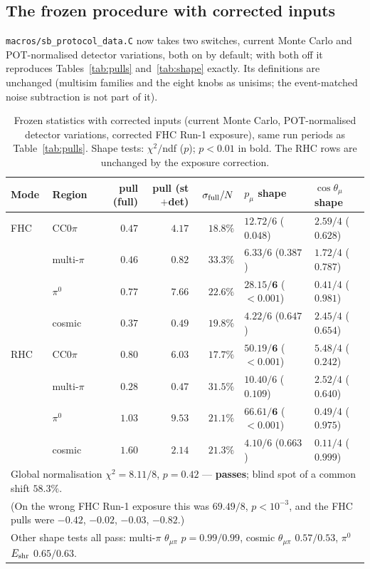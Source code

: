 \documentclass[11pt,a4paper]{article}
\begin{document}
\subsection{The frozen procedure with corrected inputs}
\label{sec:protocol_corrected}

\texttt{macros/sb\_protocol\_data.C} now takes two switches, current Monte Carlo and POT-normalised detector
variations, both on by default; with both off it reproduces Tables~\ref{tab:pulls} and~\ref{tab:shape} exactly.
Its definitions are unchanged (multisim families and the eight knobs as unisims; the event-matched noise
subtraction is not part of it).

\begin{table}[H]
  \centering
  \caption{Frozen statistics with corrected inputs (current Monte Carlo, POT-normalised detector variations,
    corrected FHC Run-1 exposure), same run periods as Table~\ref{tab:pulls}. Shape tests: $\chi^2/$ndf ($p$);
    $p<0.01$ in bold. The RHC rows are unchanged by the exposure correction.}
  \label{tab:protocol_corrected}
  \small
  \begin{tabular}{llrrr|ll}
    \toprule
    Mode & Region & pull (full) & pull (st$+$det) & $\sigma_{\rm full}/N$ & $p_\mu$ shape & $\cos\theta_\mu$ shape \\
    \midrule
    FHC & CC$0\pi$    & $0.47$ & $4.17$ & $18.8\%$ & $12.72/6$ ($0.048$) & $2.59/4$ ($0.628$) \\
        & multi-$\pi$ & $0.46$ & $0.82$ & $33.3\%$ & $6.33/6$ ($0.387$) & $1.72/4$ ($0.787$) \\
        & $\pi^0$     & $0.77$ & $7.66$ & $22.6\%$ & $\mathbf{28.15/6}$ ($\mathbf{<0.001}$) & $0.41/4$ ($0.981$) \\
        & cosmic      & $0.37$ & $0.49$ & $19.8\%$ & $4.22/6$ ($0.647$) & $2.45/4$ ($0.654$) \\
    \midrule
    RHC & CC$0\pi$    & $0.80$ & $6.03$ & $17.7\%$ & $\mathbf{50.19/6}$ ($\mathbf{<0.001}$) & $5.48/4$ ($0.242$) \\
        & multi-$\pi$ & $0.28$ & $0.47$ & $31.5\%$ & $10.40/6$ ($0.109$) & $2.52/4$ ($0.640$) \\
        & $\pi^0$     & $1.03$ & $9.53$ & $21.1\%$ & $\mathbf{66.61/6}$ ($\mathbf{<0.001}$) & $0.49/4$ ($0.975$) \\
        & cosmic      & $1.60$ & $2.14$ & $21.3\%$ & $4.10/6$ ($0.663$) & $0.11/4$ ($0.999$) \\
    \midrule
    \multicolumn{7}{l}{Global normalisation $\chi^2 = 8.11/8$, $p=0.42$ --- \textbf{passes}; blind spot of a common shift $58.3\%$.} \\
    \multicolumn{7}{l}{(On the wrong FHC Run-1 exposure this was $69.49/8$, $p<10^{-3}$, and the FHC pulls were $-0.42$, $-0.02$, $-0.03$, $-0.82$.)} \\
    \multicolumn{7}{l}{Other shape tests all pass: multi-$\pi$ $\theta_{\mu\pi}$ $p=0.99/0.99$, cosmic $\theta_{\mu\pi}$ $0.57/0.53$, $\pi^0$ $E_{\rm shr}$ $0.65/0.63$.} \\
    \bottomrule
  \end{tabular}
\end{table}
\end{document}
